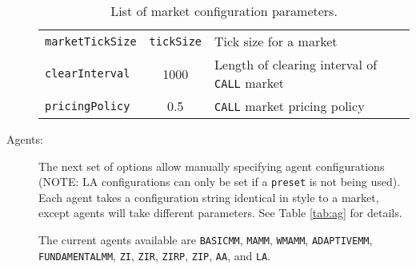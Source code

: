\documentclass[11pt]{article}
\begin{document}
\begin{description}
\begin{table}
\begin{tabular}[f]{p{} c p{}}
\verb|marketTickSize|		& \verb|tickSize| & Tick size for a market \\

\verb|clearInterval| 		& 1000 & Length of clearing interval of \verb|CALL| market \\
\verb|pricingPolicy|			& 0.5 & \verb|CALL| market pricing policy

\end{tabular}
\caption{List of market configuration parameters.}
\label{tab:mkt}
\end{table}

\item[Agents:] The next set of options allow manually specifying agent
  configurations (NOTE: LA configurations can only be set if a \texttt{preset} is not being used). 
   Each agent takes a configuration string identical in style to a market, except agents
  will take different parameters. See Table \ref{tab:ag} for details.
  
  The current agents available are \texttt{BASICMM}, \texttt{MAMM}, \texttt{WMAMM}, \texttt{ADAPTIVEMM}, \texttt{FUNDAMENTALMM},
  \texttt{ZI}, \texttt{ZIR}, \texttt{ZIRP}, \texttt{ZIP}, \texttt{AA}, and \texttt{LA}.
  

\end{description}
\end{document}
